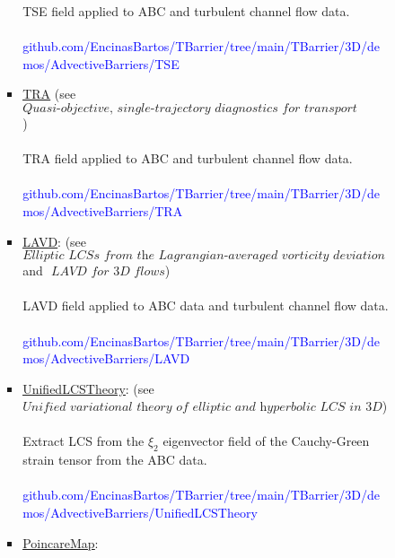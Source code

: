 \documentclass{article}
\begin{document}
\begin{enumerate}
\begin{enumerate}
\begin{enumerate}
\begin{itemize}
TSE field applied to ABC and turbulent channel flow data.\\ \\
\textcolor{blue}{{\footnotesize github.com/EncinasBartos/TBarrier/tree/main/TBarrier/3D/demos/AdvectiveBarriers/TSE}} \\
  \item \href{https://github.com/EncinasBartos/TBarrier/tree/main/TBarrier/3D/demos/AdvectiveBarriers/TRA}{\underline{TRA}} (see $ \textit{Quasi-objective, single-trajectory diagnostics for transport
barriers} $) \\ \\
TRA field applied to ABC and turbulent channel flow data.\\ \\
\textcolor{blue}{{\footnotesize github.com/EncinasBartos/TBarrier/tree/main/TBarrier/3D/demos/AdvectiveBarriers/TRA}} \\
\item \href{https://github.com/EncinasBartos/TBarrier/tree/main/TBarrier/2D/demos/AdvectiveBarriers/LAVD}{\underline{LAVD}}: (see $ \textit{Elliptic LCSs from the Lagrangian-averaged vorticity deviation} $ and $ \textit{ LAVD for 3D flows} $) \\ \\
LAVD field applied to ABC data and turbulent channel flow data.\\ \\
\textcolor{blue}{{\footnotesize github.com/EncinasBartos/TBarrier/tree/main/TBarrier/3D/demos/AdvectiveBarriers/LAVD}} \\
\item \href{https://github.com/EncinasBartos/TBarrier/tree/main/TBarrier/3D/demos/AdvectiveBarriers/UnifiedLCSTheory}{\underline{UnifiedLCSTheory}}: (see $ \textit{Unified variational theory of elliptic and hyperbolic LCS in 3D} $) \\ \\
Extract LCS from the $ \xi_2 $ eigenvector field of the Cauchy-Green strain tensor from the ABC data. \\ \\ 
\textcolor{blue}{{\footnotesize github.com/EncinasBartos/TBarrier/tree/main/TBarrier/3D/demos/AdvectiveBarriers/UnifiedLCSTheory}} \\ 
\item \href{https://github.com/EncinasBartos/TBarrier/tree/main/TBarrier/3D/demos/AdvectiveBarriers/PoincareMap}{\underline{PoincareMap}}: \\ \\

\end{itemize}
\end{enumerate}
\end{enumerate}
\end{enumerate}
\end{document}
